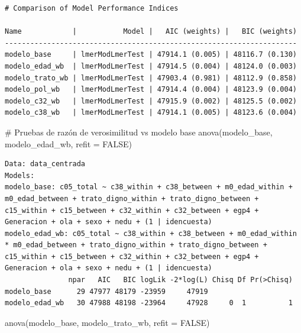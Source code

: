\documentclass[
  spanish,
  a4paper,
  oneside]{scrbook}
\newenvironment{Shaded}{\begin{snugshade}}{\end{snugshade}}
\newcommand{\AttributeTok}[1]{\textcolor[rgb]{0.40,0.45,0.13}{#1}}
\newcommand{\CommentTok}[1]{\textcolor[rgb]{0.37,0.37,0.37}{#1}}
\newcommand{\ConstantTok}[1]{\textcolor[rgb]{0.56,0.35,0.01}{#1}}
\newcommand{\FunctionTok}[1]{\textcolor[rgb]{0.28,0.35,0.67}{#1}}
\newcommand{\NormalTok}[1]{\textcolor[rgb]{0.00,0.23,0.31}{#1}}
\begin{document}
\begin{verbatim}
# Comparison of Model Performance Indices

Name            |           Model |   AIC (weights) |   BIC (weights)
---------------------------------------------------------------------
modelo_base     | lmerModLmerTest | 47914.1 (0.005) | 48116.7 (0.130)
modelo_edad_wb  | lmerModLmerTest | 47914.5 (0.004) | 48124.0 (0.003)
modelo_trato_wb | lmerModLmerTest | 47903.4 (0.981) | 48112.9 (0.858)
modelo_pol_wb   | lmerModLmerTest | 47914.4 (0.004) | 48123.9 (0.004)
modelo_c32_wb   | lmerModLmerTest | 47915.9 (0.002) | 48125.5 (0.002)
modelo_c38_wb   | lmerModLmerTest | 47914.1 (0.005) | 48123.6 (0.004)
\end{verbatim}

\begin{Shaded}
\begin{Highlighting}[]
\CommentTok{\# Pruebas de razón de verosimilitud vs modelo base}
\FunctionTok{anova}\NormalTok{(modelo\_base, modelo\_edad\_wb,  }\AttributeTok{refit =} \ConstantTok{FALSE}\NormalTok{)}
\end{Highlighting}
\end{Shaded}

\begin{verbatim}
Data: data_centrada
Models:
modelo_base: c05_total ~ c38_within + c38_between + m0_edad_within + m0_edad_between + trato_digno_within + trato_digno_between + c15_within + c15_between + c32_within + c32_between + egp4 + Generacion + ola + sexo + nedu + (1 | idencuesta)
modelo_edad_wb: c05_total ~ c38_within + c38_between + m0_edad_within * m0_edad_between + trato_digno_within + trato_digno_between + c15_within + c15_between + c32_within + c32_between + egp4 + Generacion + ola + sexo + nedu + (1 | idencuesta)
               npar   AIC   BIC logLik -2*log(L) Chisq Df Pr(>Chisq)
modelo_base      29 47977 48179 -23959     47919                    
modelo_edad_wb   30 47988 48198 -23964     47928     0  1          1
\end{verbatim}

\begin{Shaded}
\begin{Highlighting}[]
\FunctionTok{anova}\NormalTok{(modelo\_base, modelo\_trato\_wb, }\AttributeTok{refit =} \ConstantTok{FALSE}\NormalTok{)}
\end{Highlighting}
\end{Shaded}
\end{document}
